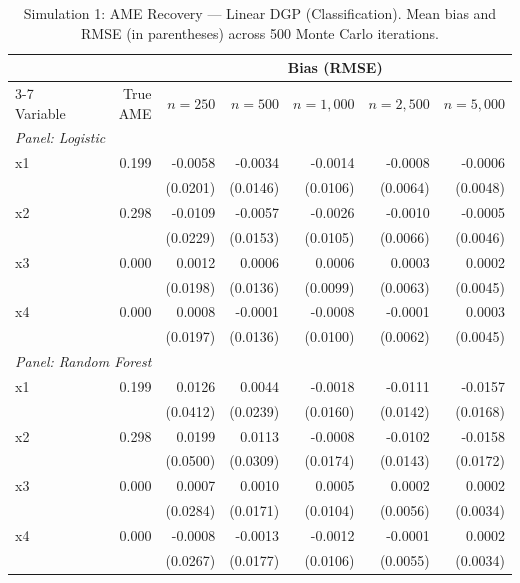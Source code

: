 \documentclass[12pt]{article}
\begin{document}
	\begin{table}[htbp]
		\centering
		\small
		\begin{threeparttable}
			\caption{Simulation 1: AME Recovery --- Linear DGP (Classification). Mean bias and RMSE (in parentheses) across 500 Monte Carlo iterations.}
			\label{tab:sim1_classification_linear}
			\begin{tabular}{lrrrrrr}
				\toprule
				& & \multicolumn{5}{c}{Bias (RMSE)} \\
				\cmidrule(lr){3-7}
				Variable & True AME & $n=250$ & $n=500$ & $n=1,000$ & $n=2,500$ & $n=5,000$ \\
				\midrule
				\multicolumn{7}{l}{\textit{Panel: Logistic}} \\
				\quad x1 & 0.199 & -0.0058 & -0.0034 & -0.0014 & -0.0008 & -0.0006 \\
				&  & (0.0201) & (0.0146) & (0.0106) & (0.0064) & (0.0048) \\
				\quad x2 & 0.298 & -0.0109 & -0.0057 & -0.0026 & -0.0010 & -0.0005 \\
				&  & (0.0229) & (0.0153) & (0.0105) & (0.0066) & (0.0046) \\
				\quad x3 & 0.000 & 0.0012 & 0.0006 & 0.0006 & 0.0003 & 0.0002 \\
				&  & (0.0198) & (0.0136) & (0.0099) & (0.0063) & (0.0045) \\
				\quad x4 & 0.000 & 0.0008 & -0.0001 & -0.0008 & -0.0001 & 0.0003 \\
				&  & (0.0197) & (0.0136) & (0.0100) & (0.0062) & (0.0045) \\
				\midrule
				\multicolumn{7}{l}{\textit{Panel: Random Forest}} \\
				\quad x1 & 0.199 & 0.0126 & 0.0044 & -0.0018 & -0.0111 & -0.0157 \\
				&  & (0.0412) & (0.0239) & (0.0160) & (0.0142) & (0.0168) \\
				\quad x2 & 0.298 & 0.0199 & 0.0113 & -0.0008 & -0.0102 & -0.0158 \\
				&  & (0.0500) & (0.0309) & (0.0174) & (0.0143) & (0.0172) \\
				\quad x3 & 0.000 & 0.0007 & 0.0010 & 0.0005 & 0.0002 & 0.0002 \\
				&  & (0.0284) & (0.0171) & (0.0104) & (0.0056) & (0.0034) \\
				\quad x4 & 0.000 & -0.0008 & -0.0013 & -0.0012 & -0.0001 & 0.0002 \\
				&  & (0.0267) & (0.0177) & (0.0106) & (0.0055) & (0.0034) \\
				\midrule

\end{tabular}
\end{threeparttable}
\end{table}
\end{document}
